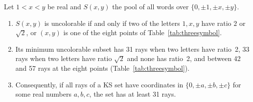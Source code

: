 \begin{theorem}\label{thm:threesymbol}
Let $1<x<y$ be real and $S(x,y)$ the pool of all words over $\{0,\pm1,\pm x,\pm y\}$.
\begin{enumerate}[label=(\roman*)]
\item $S(x,y)$ is uncolorable if and only if two of the letters $1,x,y$ have ratio $2$ or
$\sqrt2$, or $(x,y)$ is one of the eight points of Table~\ref{tab:threesymbol}.
\item Its minimum uncolorable subset has 31 rays when two letters have ratio~2, 33 rays when two
letters have ratio $\sqrt2$ and none has ratio~2, and between 42 and 57 rays at the eight points
(Table~\ref{tab:threesymbol}).
\item Consequently, if all rays of a KS set have coordinates in $\{0,\pm a,\pm b,\pm c\}$ for some
real numbers $a,b,c$, the set has at least 31 rays.
\end{enumerate}
\end{theorem}

